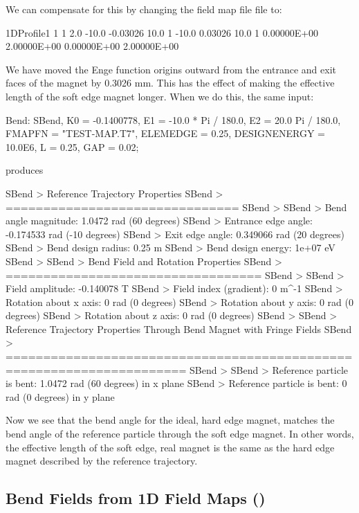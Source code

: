 We can compensate for this by changing the field map file  file to:
\begin{example}
1DProfile1 1 1 2.0
 -10.0  -0.03026  10.0 1
 -10.0  0.03026  10.0 1
  0.00000E+00
  2.00000E+00
  0.00000E+00
  2.00000E+00
\end{example}
We have moved the Enge function origins  outward from the entrance
and exit faces of the magnet  by 0.3026 mm. This has the effect of making the
effective length of the soft edge magnet longer. When we do this, the same input:

\begin{example}
Bend: SBend, K0 = -0.1400778,
             E1 = -10.0 * Pi / 180.0,
             E2 = 20.0  Pi / 180.0,
	     FMAPFN = "TEST-MAP.T7",
	     ELEMEDGE = 0.25,
	     DESIGNENERGY = 10.0E6,
             L = 0.25,
	     GAP = 0.02;
\end{example}
produces

\begin{example}
SBend > Reference Trajectory Properties
SBend > ===============================
SBend >
SBend > Bend angle magnitude:    1.0472 rad (60 degrees)
SBend > Entrance edge angle:     -0.174533 rad (-10 degrees)
SBend > Exit edge angle:         0.349066 rad (20 degrees)
SBend > Bend design radius:      0.25 m
SBend > Bend design energy:      1e+07 eV
SBend >
SBend > Bend Field and Rotation Properties
SBend > ==================================
SBend >
SBend > Field amplitude:         -0.140078 T
SBend > Field index (gradient):  0 m^-1
SBend > Rotation about x axis:   0 rad (0 degrees)
SBend > Rotation about y axis:   0 rad (0 degrees)
SBend > Rotation about z axis:   0 rad (0 degrees)
SBend >
SBend > Reference Trajectory Properties Through Bend Magnet with Fringe Fields
SBend > ======================================================================
SBend >
SBend > Reference particle is bent: 1.0472 rad (60 degrees) in x plane
SBend > Reference particle is bent: 0 rad (0 degrees) in y plane
\end{example}
Now we see that the bend angle for the ideal, hard edge magnet, matches the bend angle of the
reference particle through the soft edge magnet. In other words, the effective length of the soft edge,
 real magnet is the same as the hard edge magnet described by the reference trajectory.

\subsection{Bend Fields from 1D Field Maps (\opalt)}
\label{ssec:opaltrbendsbendfields}

